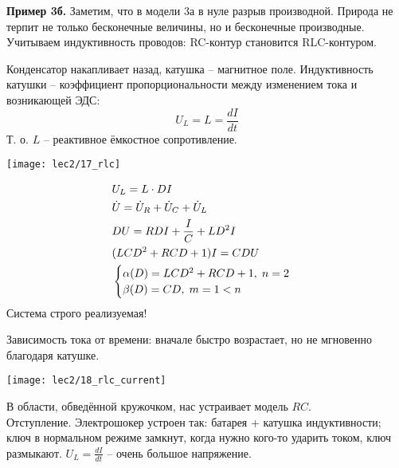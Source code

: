 \documentclass[main.tex]{subfiles}
\begin{document}
\textbf{Пример 3б.} Заметим, что в модели 3а в нуле разрыв производной.
Природа не терпит не только бесконечные величины, но и бесконечные производные.
Учитываем индуктивность проводов: RC-контур становится RLC-контуром.

Конденсатор накапливает назад, катушка -- магнитное поле.
Индуктивность катушки -- коэффициент пропорциональности между изменением тока и возникающей ЭДС:
\[ U_L = L =\frac{d I}{d t} \]
Т. о. $ L $ -- реактивное ёмкостное сопротивление.

\texttt{[image: lec2/17\_rlc]}

\begin{align*}
    & U_L = L \cdot DI \\
    & \dot U = \dot U_R + \dot U_C + \dot U_L \\
    & DU = RDI + \frac{I}{C} + LD^2 I \\
    & (LCD^2 + RCD + 1)I = CDU \\
    & \begin{cases}
        \alpha(D) = LCD^2 + RCD + 1, \thickspace n = 2 \\
        \beta(D) = CD, \thickspace m = 1 < n
    \end{cases}
\end{align*}
Система строго реализуемая!

Зависимость тока от времени: вначале быстро возрастает, но не мгновенно благодаря катушке.

\texttt{[image: lec2/18\_rlc\_current]}

В области, обведённой кружочком, нас устраивает модель $ RC $. \\

Отступление.
Электрошокер устроен так: батарея + катушка индуктивности; ключ в нормальном режиме замкнут, когда нужно кого-то ударить током, ключ размыкают.
$ U_L = \frac{d I}{d t} $ -- очень большое напряжение.
\end{document}
